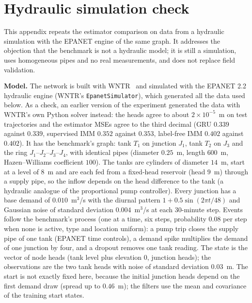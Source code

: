 \documentclass[conference]{IEEEtran}
\begin{document}
\footnotesize
\section{Hydraulic simulation check}

This appendix repeats the estimator comparison on data from a hydraulic simulation with the EPANET engine of the same graph. It addresses the objection that the benchmark is not a hydraulic model; it is still a simulation, uses homogeneous pipes and no real measurements, and does not replace field validation.

\textbf{Model.} The network is built with WNTR~\cite{klise2017} and simulated with the EPANET 2.2 hydraulic engine (WNTR's \texttt{EpanetSimulator}), which generated all the data used below. As a check, an earlier version of the experiment generated the data with WNTR's own Python solver instead: the heads agree to about $2\times10^{-5}$~m on test trajectories and the estimator MSEs agree to the third decimal (GRU $0.339$ against $0.339$, supervised IMM $0.352$ against $0.353$, label-free IMM $0.402$ against $0.402$). It has the benchmark's graph: tank $T_1$ on junction $J_1$, tank $T_2$ on $J_3$ and the ring $J_1$--$J_2$--$J_3$--$J_4$, with identical pipes (diameter $0.25$~m, length $600$~m, Hazen--Williams coefficient $100$). The tanks are cylinders of diameter $14$~m, start at a level of $8$~m and are each fed from a fixed-head reservoir (head $9$~m) through a supply pipe, so the inflow depends on the head difference to the tank (a hydraulic analogue of the proportional pump controller). Every junction has a base demand of $0.010$~m$^3$/s with the diurnal pattern $1+0.5\sin(2\pi t/48)$ and Gaussian noise of standard deviation $0.004$~m$^3$/s at each 30-minute step. Events follow the benchmark's process (one at a time, six steps, probability $0.08$ per step when none is active, type and location uniform): a pump trip closes the supply pipe of one tank (EPANET time controls), a demand spike multiplies the demand of one junction by four, and a dropout removes one tank reading. The state is the vector of node heads (tank level plus elevation $0$, junction heads); the observations are the two tank heads with noise of standard deviation $0.03$~m. The start is not exactly fixed here, because the initial junction heads depend on the first demand draw (spread up to $0.46$~m); the filters use the mean and covariance of the training start states.
\end{document}

